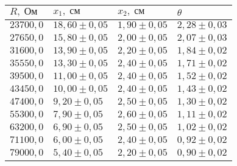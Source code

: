 \begin{tabular}{|l|l|l|l|}
\hline
$R,\;\text{Ом}$ & $x_1,\;\text{см}$ & $x_2,\;\text{см}$ & $\theta$\\\hline
$23700{,}0$ & $18{,}60 \pm 0{,}05$ & $1{,}90 \pm 0{,}05$ & $2{,}28 \pm 0{,}03$\\\hline
$27650{,}0$ & $15{,}80 \pm 0{,}05$ & $2{,}00 \pm 0{,}05$ & $2{,}07 \pm 0{,}03$\\\hline
$31600{,}0$ & $13{,}90 \pm 0{,}05$ & $2{,}20 \pm 0{,}05$ & $1{,}84 \pm 0{,}02$\\\hline
$35550{,}0$ & $13{,}30 \pm 0{,}05$ & $2{,}40 \pm 0{,}05$ & $1{,}71 \pm 0{,}02$\\\hline
$39500{,}0$ & $11{,}00 \pm 0{,}05$ & $2{,}40 \pm 0{,}05$ & $1{,}52 \pm 0{,}02$\\\hline
$43450{,}0$ & $10{,}00 \pm 0{,}05$ & $2{,}40 \pm 0{,}05$ & $1{,}43 \pm 0{,}02$\\\hline
$47400{,}0$ & $9{,}20 \pm 0{,}05$ & $2{,}50 \pm 0{,}05$ & $1{,}30 \pm 0{,}02$\\\hline
$55300{,}0$ & $7{,}90 \pm 0{,}05$ & $2{,}60 \pm 0{,}05$ & $1{,}11 \pm 0{,}02$\\\hline
$63200{,}0$ & $6{,}90 \pm 0{,}05$ & $2{,}50 \pm 0{,}05$ & $1{,}02 \pm 0{,}02$\\\hline
$71100{,}0$ & $6{,}00 \pm 0{,}05$ & $2{,}40 \pm 0{,}05$ & $0{,}92 \pm 0{,}02$\\\hline
$79000{,}0$ & $5{,}40 \pm 0{,}05$ & $2{,}20 \pm 0{,}05$ & $0{,}90 \pm 0{,}02$\\\hline
\end{tabular}
